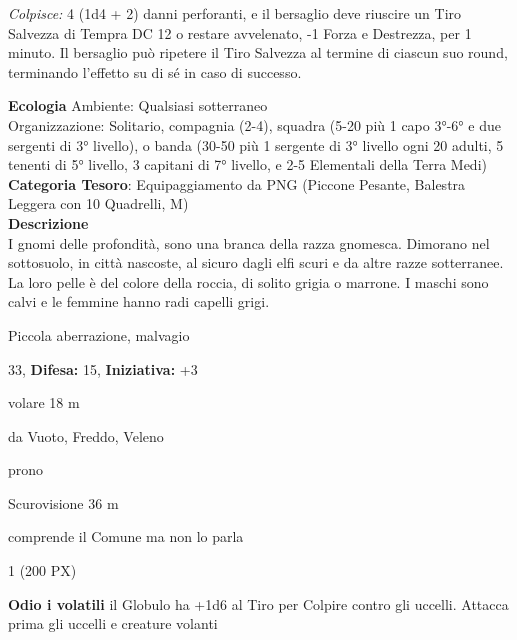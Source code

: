 \begin{multicols}{2}
{\emph{Colpisce:} 4 (1d4 + 2) danni perforanti, e il bersaglio deve riuscire un Tiro Salvezza di Tempra DC 12 o restare avvelenato, -1 Forza e Destrezza, per 1 minuto. Il bersaglio può ripetere il Tiro Salvezza al termine di ciascun suo round, terminando l'effetto su di sé in caso di successo.

\textbf{Ecologia}
Ambiente: Qualsiasi sotterraneo\\
Organizzazione: Solitario, compagnia (2-4), squadra (5-20 più 1 capo 3°-6° e due sergenti di 3° livello), o banda (30-50 più 1 sergente di 3° livello ogni 20 adulti, 5 tenenti di 5° livello, 3 capitani di 7° livello, e 2-5 Elementali della Terra Medi)\\
\textbf{Categoria Tesoro}: Equipaggiamento da PNG (Piccone Pesante, Balestra Leggera con 10 Quadrelli, M)\\
\textbf{Descrizione}\\
I gnomi delle profondità, sono una branca della razza gnomesca. Dimorano nel sottosuolo, in città nascoste, al sicuro dagli elfi scuri e da altre razze sotterranee. La loro pelle è del colore della roccia, di solito grigia o marrone. I maschi sono calvi e le femmine hanno radi capelli grigi.

\noindent
\begin{description}[noitemsep, topsep=0pt, parsep=0pt, partopsep=0pt, leftmargin=0cm, labelwidth=2.2cm]
	\item[\textbf{Taglia/Tipo:}] Piccola aberrazione, malvagio
	\item[\textbf{Caratt.:}] 
	\item[\textbf{Punti Ferita:}] 33,  \textbf{Difesa:} 15,  \textbf{Iniziativa:} +3
	\item[\textbf{Movimento:}] volare 18 m
	\item[\textbf{Tiri Salvez.:}] 
	\item[\textbf{Imm. Danni:}] da Vuoto, Freddo, Veleno\\
	\item[\textbf{Immunità:}] prono
	\item[\textbf{Sensi:}] Scurovisione 36 m
	\item[\textbf{Linguaggi:}] comprende il Comune ma non lo parla
	\item[\textbf{Sfida:}] 1 (200 PX)\smallskip
\end{description}

\textbf{Odio i volatili} il Globulo ha +1d6 al Tiro per Colpire contro gli uccelli. Attacca prima gli uccelli e creature volanti

}
\end{multicols}
